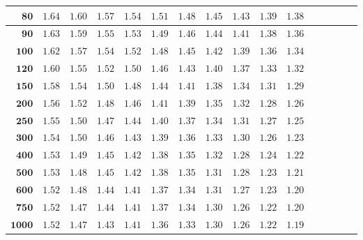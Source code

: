 \begin{customTableWrapper}{1.4}
\begin{longtable}{|r|r|r|r|r|r|r|r|r|r|r|r|r|r|r|r|}
    ${\mathbf{80}}$ & ${1.64}$   & ${1.60}$   & ${1.57}$   & ${1.54}$   & ${1.51}$   & ${1.48}$   & ${1.45}$   & ${1.43}$   & ${1.39}$   & ${1.38}$   \\ \hline 
    ${\mathbf{90}}$ & ${1.63}$   & ${1.59}$   & ${1.55}$   & ${1.53}$   & ${1.49}$   & ${1.46}$   & ${1.44}$   & ${1.41}$   & ${1.38}$   & ${1.36}$   \\ \hline 
    ${\mathbf{100}}$ & ${1.62}$   & ${1.57}$   & ${1.54}$   & ${1.52}$   & ${1.48}$   & ${1.45}$   & ${1.42}$   & ${1.39}$   & ${1.36}$   & ${1.34}$   \\ \hline 
    ${\mathbf{120}}$ & ${1.60}$   & ${1.55}$   & ${1.52}$   & ${1.50}$   & ${1.46}$   & ${1.43}$   & ${1.40}$   & ${1.37}$   & ${1.33}$   & ${1.32}$   \\ \hline 
    ${\mathbf{150}}$ & ${1.58}$   & ${1.54}$   & ${1.50}$   & ${1.48}$   & ${1.44}$   & ${1.41}$   & ${1.38}$   & ${1.34}$   & ${1.31}$   & ${1.29}$   \\ \hline 
    ${\mathbf{200}}$ & ${1.56}$   & ${1.52}$   & ${1.48}$   & ${1.46}$   & ${1.41}$   & ${1.39}$   & ${1.35}$   & ${1.32}$   & ${1.28}$   & ${1.26}$   \\ \hline 
    ${\mathbf{250}}$ & ${1.55}$   & ${1.50}$   & ${1.47}$   & ${1.44}$   & ${1.40}$   & ${1.37}$   & ${1.34}$   & ${1.31}$   & ${1.27}$   & ${1.25}$   \\ \hline 
    ${\mathbf{300}}$ & ${1.54}$   & ${1.50}$   & ${1.46}$   & ${1.43}$   & ${1.39}$   & ${1.36}$   & ${1.33}$   & ${1.30}$   & ${1.26}$   & ${1.23}$   \\ \hline 
    ${\mathbf{400}}$ & ${1.53}$   & ${1.49}$   & ${1.45}$   & ${1.42}$   & ${1.38}$   & ${1.35}$   & ${1.32}$   & ${1.28}$   & ${1.24}$   & ${1.22}$   \\ \hline 
    ${\mathbf{500}}$ & ${1.53}$   & ${1.48}$   & ${1.45}$   & ${1.42}$   & ${1.38}$   & ${1.35}$   & ${1.31}$   & ${1.28}$   & ${1.23}$   & ${1.21}$   \\ \hline 
    ${\mathbf{600}}$ & ${1.52}$   & ${1.48}$   & ${1.44}$   & ${1.41}$   & ${1.37}$   & ${1.34}$   & ${1.31}$   & ${1.27}$   & ${1.23}$   & ${1.20}$   \\ \hline 
    ${\mathbf{750}}$ & ${1.52}$   & ${1.47}$   & ${1.44}$   & ${1.41}$   & ${1.37}$   & ${1.34}$   & ${1.30}$   & ${1.26}$   & ${1.22}$   & ${1.20}$   \\ \hline 
    ${\mathbf{1000}}$ & ${1.52}$   & ${1.47}$   & ${1.43}$   & ${1.41}$   & ${1.36}$   & ${1.33}$   & ${1.30}$   & ${1.26}$   & ${1.22}$   & ${1.19}$   \\ \hline 


\end{longtable}
\end{customTableWrapper}
\changefontsizes{11pt}


